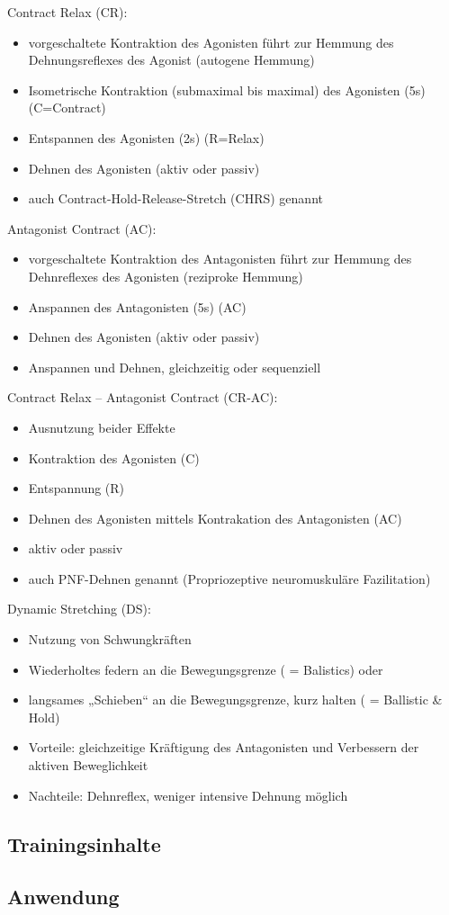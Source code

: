 Contract Relax (CR):
\begin{itemize}
    \item vorgeschaltete Kontraktion des Agonisten führt zur Hemmung des Dehnungsreflexes des Agonist (autogene Hemmung)
    \item Isometrische Kontraktion (submaximal bis maximal) des Agonisten (5s) (C=Contract)
    \item Entspannen des Agonisten (2s) (R=Relax)
    \item Dehnen des Agonisten (aktiv oder passiv)
    \item auch Contract-Hold-Release-Stretch (CHRS) genannt
\end{itemize}

Antagonist Contract (AC):
\begin{itemize}
    \item vorgeschaltete Kontraktion des Antagonisten führt zur Hemmung des Dehnreflexes des Agonisten (reziproke Hemmung)
    \item Anspannen des Antagonisten (5s) (AC)
    \item Dehnen des Agonisten (aktiv oder passiv)
    \item Anspannen und Dehnen, gleichzeitig oder sequenziell
\end{itemize}

Contract Relax – Antagonist Contract (CR-AC):
\begin{itemize}
    \item Ausnutzung beider Effekte
    \item Kontraktion des Agonisten (C)
    \item Entspannung (R)
    \item Dehnen des Agonisten mittels Kontrakation des Antagonisten (AC)
    \item aktiv oder passiv
    \item auch PNF-Dehnen genannt (Propriozeptive neuromuskuläre Fazilitation)
\end{itemize}

Dynamic Stretching (DS):
\begin{itemize}
    \item Nutzung von Schwungkräften
    \item Wiederholtes federn an die Bewegungsgrenze ( = Balistics) oder
    \item langsames „Schieben“ an die Bewegungsgrenze, kurz halten ( = Ballistic & Hold)
    \item Vorteile: gleichzeitige Kräftigung des Antagonisten und Verbessern der aktiven Beweglichkeit
    \item Nachteile: Dehnreflex, weniger intensive Dehnung möglich
\end{itemize}

\subsection{Trainingsinhalte}



\subsection{Anwendung}

